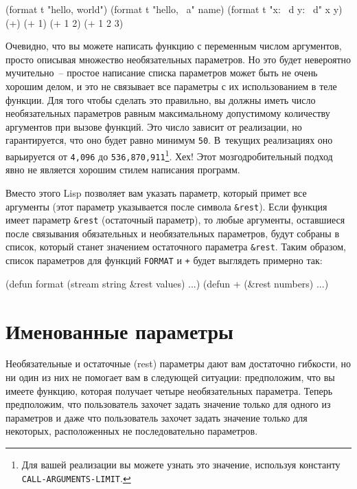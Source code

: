 \begin{myverb}
(format t "hello, world")
(format t "hello, ~a" name)
(format t "x: ~d y: ~d" x y)
(+)
(+ 1)
(+ 1 2)
(+ 1 2 3)
\end{myverb}

Очевидно, что вы можете написать функцию с переменным числом аргументов, просто описывая
множество необязательных параметров.  Но это будет невероятно мучительно~-- простое
написание списка параметров может быть не очень хорошим делом, и это не связывает все
параметры с их использованием в теле функции.  Для того чтобы сделать это правильно, вы
должны иметь число необязательных параметров равным максимальному допустимому количеству
аргументов при вызове функций.  Это число зависит от реализации, но гарантируется, что оно
будет равно минимум \lstinline{50}.  В~текущих реализациях оно варьируется от \lstinline{4,096} до
\lstinline{536,870,911}\footnote{Для вашей реализации вы можете узнать это значение, используя
  константу \lstinline{CALL-ARGUMENTS-LIMIT}.}\hspace{\footnotenegspace}.  Хех!  Этот мозгодробительный подход явно не
является хорошим стилем написания программ.

Вместо этого Lisp позволяет вам указать параметр, который примет все аргументы (этот
параметр указывается после символа \lstinline!&rest!).  Если функция имеет параметр
\lstinline!&rest! (остаточный параметр), то любые аргументы, оставшиеся после связывания
обязательных и необязательных параметров, будут собраны в список, который станет значением
остаточного параметра \lstinline!&rest!.  Таким образом, список параметров для функций
\lstinline{FORMAT} и \lstinline{+} будет выглядеть примерно так:

\begin{myverb}
(defun format (stream string &rest values) ...)
(defun + (&rest numbers) ...) 
\end{myverb}

\section{Именованные параметры}

Необязательные и остаточные (rest) параметры дают вам достаточно гибкости, но ни один из
них не помогает вам в следующей ситуации: предположим, что вы имеете функцию, которая
получает четыре необязательных параметра.  Теперь предположим, что пользователь захочет
задать значение только для одного из параметров и даже что пользователь захочет задать
значение только для некоторых, расположенных не последовательно параметров.

